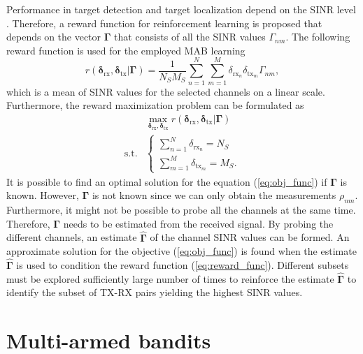\documentclass[conference]{IEEEtran}
\newcommand{\esinrexp}{\Gamma_{nm}}
\newcommand{\vsinrexp}{\boldsymbol{\Gamma}}
\newcommand{\vsinrb}{\widehat{\boldsymbol{\Gamma}}}
\newcommand{\easvtx}{\delta_{\text{tx}_m}}
\newcommand{\vasvtx}{\boldsymbol{\delta}_{\text{tx}}}
\newcommand{\easvrx}{\delta_{\text{rx}_n}}
\newcommand{\vasvrx}{\boldsymbol{\delta}_{\text{rx}}}
\newcommand{\esp}{\rho_{nm}}
\begin{document}
Performance in target detection and target localization depend on the SINR level \cite{Aittomaeki2011, Godrich2011, Sun2014}.
Therefore, a reward function for reinforcement learning is proposed that depends on the vector $\vsinrexp$ that consists of all the SINR values $\esinrexp$.
The following reward function is used for the employed MAB learning
\begin{equation}\label{eq:reward_func}
    r(\vasvrx, \vasvtx | \vsinrexp) = \frac{1}{N_S M_S}\sum_{n=1}^N \sum_{m=1}^M  \easvrx \easvtx \esinrexp,
\end{equation}
which is a mean of SINR values for the selected channels on a linear scale.
Furthermore, the reward maximization problem can be formulated as
\begin{equation}\label{eq:obj_func}
    \begin{array}{ll}
                &   \max_{\vasvrx, \vasvtx} r(\vasvrx, \vasvtx | \vsinrexp) \\[7pt]
    \text{s.t.} &   
                \left\{\begin{array}{l}
                    \sum_{n=1}^N \easvrx = N_S \\
                    \sum_{m=1}^M \easvtx = M_S.
                \end{array}\right.
    \end{array}
\end{equation}
It is possible to find an optimal solution for the equation (\ref{eq:obj_func}) if $\vsinrexp$ is known.
However, $\vsinrexp$ is not known since we can only obtain the measurements $\esp$. 
Furthermore, it might not be possible to probe all the channels at the same time.
Therefore, $\vsinrexp$ needs to be estimated from the received signal. 
By probing the different channels, an estimate $\vsinrb$ of the channel SINR values can be formed.
An approximate solution for the objective (\ref{eq:obj_func}) is found when the estimate $\vsinrb$ is used to condition the reward function (\ref{eq:reward_func}).
Different subsets must be explored sufficiently large number of times to reinforce the estimate $\vsinrb$ to identify the subset of TX-RX pairs yielding the highest SINR values.

\section{Multi-armed bandits}
\label{sec:mab}
\end{document}
